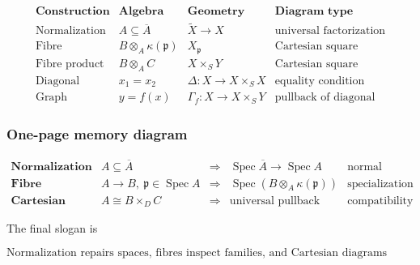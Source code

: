 \documentclass[12pt,a4paper]{article}
\theoremstyle{notespace}
\begin{document}
\[
\begin{array}{c|c|c|c}
	\textbf{Construction}
	&
	\textbf{Algebra}
	&
	\textbf{Geometry}
	&
	\textbf{Diagram type}
	\\
	\hline
	\text{Normalization}
	&
	A\subseteq \overline{A}
	&
	\widetilde{X}\to X
	&
	\text{universal factorization}
	\\
	\hline
	\text{Fibre}
	&
	B\otimes_A\kappa(\mathfrak{p})
	&
	X_{\mathfrak{p}}
	&
	\text{Cartesian square}
	\\
	\hline
	\text{Fibre product}
	&
	B\otimes_A C
	&
	X\times_S Y
	&
	\text{Cartesian square}
	\\
	\hline
	\text{Diagonal}
	&
	x_1=x_2
	&
	\Delta:X\to X\times_S X
	&
	\text{equality condition}
	\\
	\hline
	\text{Graph}
	&
	y=f(x)
	&
	\Gamma_f:X\to X\times_S Y
	&
	\text{pullback of diagonal}
\end{array}
\]

\subsubsection{One-page memory diagram}

\[
\begin{array}{ccccc}
	\textbf{Normalization}
	&
	A\subseteq \overline{A}
	&
	\Longrightarrow
	&
	\operatorname{Spec}\overline{A}\to \operatorname{Spec}A
	&
	\text{normal model}
	\\[1em]
	\textbf{Fibre}
	&
	A\to B,\ \mathfrak{p}\in \operatorname{Spec}A
	&
	\Longrightarrow
	&
	\operatorname{Spec}\left(B\otimes_A\kappa(\mathfrak{p})\right)
	&
	\text{specialization}
	\\[1em]
	\textbf{Cartesian square}
	&
	A\cong B\times_D C
	&
	\Longrightarrow
	&
	\text{universal pullback}
	&
	\text{compatibility condition}
\end{array}
\]

The final slogan is

\[
\boxed{
	\text{Normalization repairs spaces, fibres inspect families, and Cartesian diagrams organize pullbacks.}
}
\]
\end{document}
